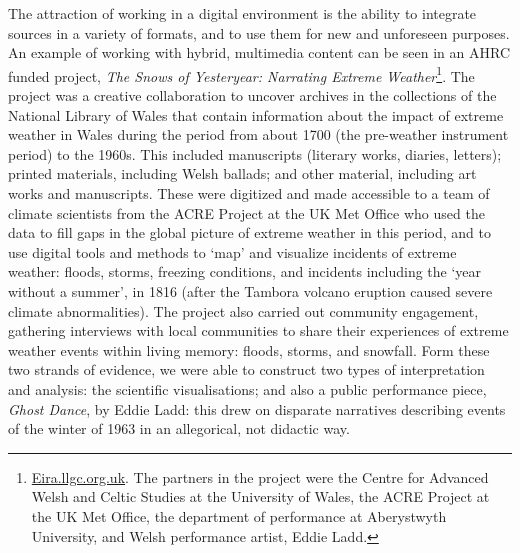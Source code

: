 \documentclass[amsthm,ebook]{saparticle}
\begin{document}
The attraction of working in a digital environment is the ability to integrate sources in a variety of formats, and to use them for new and unforeseen purposes. An example of working with hybrid, multimedia content can be seen in an AHRC funded project, \emph{The Snows of Yesteryear: Narrating Extreme Weather}\footnote{\url{Eira.llgc.org.uk}. The partners in the project were the Centre for Advanced Welsh and Celtic Studies at the University of Wales, the ACRE Project at the UK Met Office, the department of performance at Aberystwyth University, and Welsh performance artist, Eddie Ladd.}. The project was a creative collaboration to uncover archives in the collections of the National Library of Wales that contain information about the impact of extreme weather in Wales during the period from about 1700 (the pre-weather instrument period) to the 1960s. This included manuscripts (literary works, diaries, letters); printed materials, including Welsh ballads; and other material, including art works and manuscripts. These were digitized and made accessible to a team of climate scientists from the ACRE Project at the UK Met Office who used the data to fill gaps in the global picture of extreme weather in this period, and to use digital tools and methods to `map' and visualize incidents of extreme weather: floods, storms, freezing conditions, and incidents including the `year without a summer', in 1816 (after the Tambora volcano eruption caused severe climate abnormalities). The project also carried out community engagement, gathering interviews with local communities to share their experiences of extreme weather events within living memory: floods, storms, and snowfall. Form these two strands of evidence, we were able to construct two types of interpretation and analysis: the scientific visualisations; and also a public performance piece, \emph{Ghost Dance}, by Eddie Ladd: this drew on disparate narratives describing events of the winter of 1963 in an allegorical, not didactic way.
\end{document}
